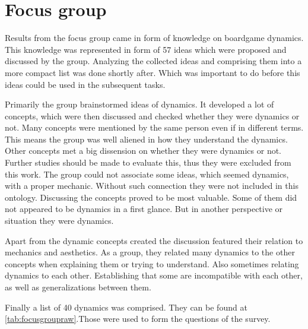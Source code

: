 \section{Focus group} 

Results from the focus group came in form of knowledge on boardgame dynamics. This knowledge was represented in form of 57 ideas which were proposed and discussed by the group. Analyzing the collected ideas and comprising them into a more compact list was done shortly after. Which was important to do before this ideas could be used in the subsequent tasks. 

Primarily the group brainstormed ideas of dynamics. It developed a lot of concepts, which were then discussed and checked whether they were dynamics or not. Many concepts were mentioned by the same person even if in different terms. This means the group was well aliened in how they understand the dynamics. Other concepts met a big dissension on whether they were dynamics or not. Further studies should be made to evaluate this, thus they were excluded from this work. The group could not associate some ideas, which seemed dynamics, with a proper mechanic. Without such connection they were not included in this ontology. Discussing the concepts proved to be most valuable. Some of them did not appeared to be dynamics in a first glance. But in another perspective or situation they were dynamics.

Apart from the dynamic concepts created the discussion featured their relation to mechanics and aesthetics. As a group, they related many dynamics to the other concepts when explaining them or trying to understand. Also sometimes relating dynamics to each other. Establishing that some are incompatible with each other, as well as generalizations between them.

Finally a list of 40 dynamics was comprised. They can be found at \ref{tab:focusgroupraw}.Those were used to form the questions of the survey. 

